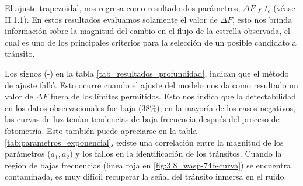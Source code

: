 El ajuste trapezoidal, nos regresa como resultado dos parámetros, $\Delta F$ y $t_{c}$ (véase II.1.1). En estos resultados evaluamos solamente el valor de $\Delta F$, esto nos brinda información sobre la magnitud del cambio en el flujo de la estrella observada, el cual es uno de los principales criterios para la selección de un posible candidato a tránsito. 

Los signos (-) en la tabla \ref{tab_resultados_profundidad}, indican que el método de ajuste falló. Esto ocurre cuando el ajuste del modelo nos da como resultado un valor de $\Delta F$ fuera de los límites permitidos. Esto nos indica que la detectabilidad en los datos observacionales fue baja (38\%), en la mayoría de los casos negativos, las curvas de luz tenían tendencias de baja frecuencia después del proceso de fotometría. Esto también puede apreciarse en la tabla \ref{tab:parametros_exponencial}, existe una correlación entre la magnitud de los parámetros ($a_{1},a_{2}$) y los fallos en la identificación de los tránsitos. Cuando la región de bajas frecuencias (línea roja en \ref{fig:3.8_wasp-74b-curva}) se encuentra contaminada, es muy difícil recuperar la señal del tránsito inmersa en el ruido.